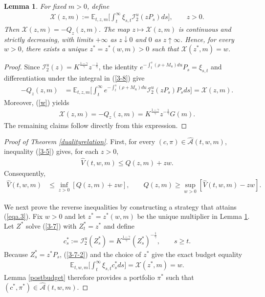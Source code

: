\documentclass[a4paper,11pt]{amsart}
\numberwithin{equation}{section}
\newtheorem{lemma}{Lemma}[section]
\begin{document}
{\begin{lemma}\label{postmultiplier}
{For fixed $m>0$, define}
\begin{align*}
{\mathcal X(z,m):=\mathbb E_{t,z,m}\bigg[\int_t^\infty\xi_{s,t}\mathcal I_2^u(zP_s)ds\bigg],\qquad z>0.}
\end{align*}
{Then $\mathcal X(z,m)=-Q_z(z,m)$. The map $z\mapsto\mathcal X(z,m)$ is continuous and strictly decreasing, with limits $+\infty$ as $z\downarrow0$ and $0$ as $z\uparrow\infty$. Hence, for every $w>0$, there exists a unique $z^\ast=z^\ast(w,m)>0$ such that $\mathcal X(z^\ast,m)=w$.}
\end{lemma}
\begin{proof}
Since $\mathcal I_2^u(z)=K^{\frac{1-\gamma}{\gamma}}z^{-\frac{1}{\gamma}}$, the identity $e^{-\int_t^s(\rho+M_u)du}P_s=\xi_{s,t}$ and differentiation under the integral in (\ref{3-8}) give
\begin{align}\label{3-7-2}
-Q_z(z,m)&=\mathbb E_{t,z,m}\bigg[\int_t^\infty e^{-\int_t^s(\rho+M_u)du}\mathcal I_2^u(zP_s)P_sds\bigg]=\mathcal X(z,m).
\end{align}
Moreover, (\ref{w}) yields
\begin{align}\label{eqa-6-1}
\mathcal X(z,m)=-Q_z(z,m)=K^{\frac{1-\gamma}{\gamma}}z^{-\frac{1}{\gamma}}G(m).
\end{align}
The remaining claims follow directly from this expression.
\end{proof}

\begin{proof}[Proof of Theorem \ref{dualityrelation}]
\color{black}
 First, for every $(c,\pi)\in\widehat{\mathcal A}(t,w,m)$, inequality (\ref{3-5}) gives, for each $z>0$,
\begin{align}\label{eqa.3}
\widehat V(t,w,m)\leq Q(z,m)+zw.
\end{align}
Consequently,
\begin{align*}
\widehat V(t,w,m)&\leq\inf_{z>0}[Q(z,m)+zw],\qquad Q(z,m)\geq\sup_{w>0}[\widehat V(t,w,m)-zw].
\end{align*}

We next prove the reverse inequalities by constructing a strategy that attains (\ref{eqa.3}). Fix $w>0$ and let $z^\ast=z^\ast(w,m)$ be the unique multiplier in Lemma \ref{postmultiplier}. Let $Z^\ast$ solve (\ref{3-7}) with $Z_t^\ast=z^\ast$ and define
\begin{align}\label{3-7-1}
c_s^\ast:=\mathcal I_2^u(Z_s^\ast)=K^{\frac{1-\gamma}{\gamma}}(Z_s^\ast)^{-\frac{1}{\gamma}},\qquad s\geq t.
\end{align}
Because $Z_s^\ast=z^\ast P_s$, (\ref{3-7-2}) and the choice of $z^\ast$ give the exact budget equality
\begin{align*}
\mathbb E_{t,w,m}\bigg[\int_t^\infty\xi_{s,t}c_s^\ast ds\bigg]=\mathcal X(z^\ast,m)=w.
\end{align*}
Lemma \ref{postbudget} therefore provides a portfolio $\pi^\ast$ such that $(c^\ast,\pi^\ast)\in\widehat{\mathcal A}(t,w,m)$.


\end{proof}}
\end{document}
